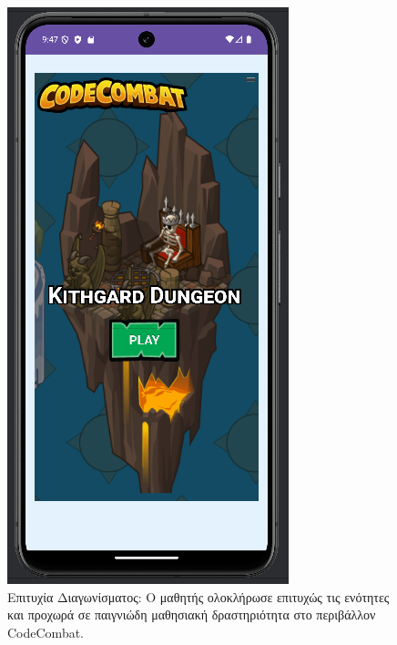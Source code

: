 \documentclass[11pt]{report}
\begin{document}
\begin{figure}[H]
  \centering
  \includegraphics[width=\linewidth, height=0.35\textheight, keepaspectratio]{Figures/εικόνα (15).png}
  \caption{Επιτυχία Διαγωνίσματος: Ο μαθητής ολοκλήρωσε επιτυχώς τις ενότητες και προχωρά σε παιγνιώδη μαθησιακή δραστηριότητα στο περιβάλλον CodeCombat.}
\end{figure}
\end{document}
